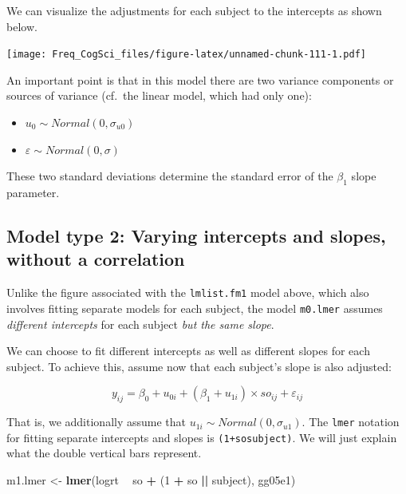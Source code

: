 \documentclass[12pt,]{krantz}
\newenvironment{Shaded}{\begin{snugshade}}{\end{snugshade}}
\newcommand{\DecValTok}[1]{\textcolor[rgb]{0.00,0.00,0.81}{#1}}
\newcommand{\KeywordTok}[1]{\textcolor[rgb]{0.13,0.29,0.53}{\textbf{#1}}}
\newcommand{\NormalTok}[1]{#1}
\newcommand{\OperatorTok}[1]{\textcolor[rgb]{0.81,0.36,0.00}{\textbf{#1}}}
\newcommand{\StringTok}[1]{\textcolor[rgb]{0.31,0.60,0.02}{#1}}
\providecommand{\tightlist}{%
  \setlength{\itemsep}{0pt}\setlength{\parskip}{0pt}}
\begin{document}
We can visualize the adjustments for each subject to the intercepts as shown below.

\texttt{[image: Freq\_CogSci\_files/figure-latex/unnamed-chunk-111-1.pdf]}

An important point is that in this model there are two variance components or sources of variance (cf.~the linear model, which had only one):

\begin{itemize}
\tightlist
\item
  \(u_0 \sim Normal(0,\sigma_{u0})\)
\item
  \(\varepsilon \sim Normal(0,\sigma)\)
\end{itemize}

These two standard deviations determine the standard error of the \(\beta_1\) slope parameter.

\hypertarget{model-type-2-varying-intercepts-and-slopes-without-a-correlation}{%
\subsection{Model type 2: Varying intercepts and slopes, without a correlation}\label{model-type-2-varying-intercepts-and-slopes-without-a-correlation}}

Unlike the figure associated with the \texttt{lmlist.fm1} model above, which also involves fitting separate models for each subject, the model \texttt{m0.lmer} assumes \emph{different intercepts} for each subject \emph{but the same slope}.

We can choose to fit different intercepts as well as different slopes for each subject. To achieve this, assume now that each subject's slope is also adjusted:

\begin{equation}
y_{ij} = \beta_0 + u_{0i}+(\beta_1+u_{1i})\times so_{ij} + \varepsilon_{ij}
\end{equation}

That is, we additionally assume that \(u_{1i} \sim Normal(0,\sigma_{u1})\). The \texttt{lmer} notation for fitting separate intercepts and slopes is \texttt{(1+so\textbar{}\textbar{}subject)}. We will just explain what the double vertical bars represent.

\begin{Shaded}
\begin{Highlighting}[]
\NormalTok{m1.lmer <-}\StringTok{ }\KeywordTok{lmer}\NormalTok{(logrt }\OperatorTok{~}\StringTok{ }\NormalTok{so }\OperatorTok{+}\StringTok{ }\NormalTok{(}\DecValTok{1} \OperatorTok{+}\StringTok{ }\NormalTok{so }\OperatorTok{||}\StringTok{ }\NormalTok{subject), gg05e1)}
\end{Highlighting}
\end{Shaded}
\end{document}
